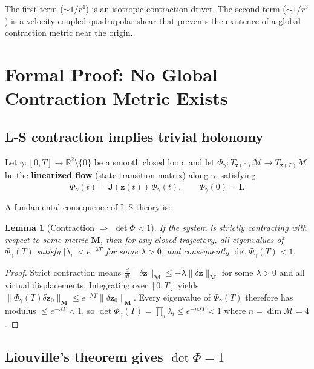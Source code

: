 \documentclass[11pt]{article}
\newtheorem{lemma}[theorem]{Lemma}
\begin{document}
The first term ($\sim 1/r^4$) is an isotropic contraction driver. The second term
($\sim 1/r^3$) is a velocity-coupled quadrupolar shear that prevents the existence
of a global contraction metric near the origin.

\section{Formal Proof: No Global Contraction Metric Exists}
\label{sec:proof}

\subsection{L-S contraction implies trivial holonomy}
\label{sec:ls-holonomy}

Let $\gamma: [0,T] \to \mathbb{R}^2 \setminus \{0\}$ be a smooth closed loop, and
let $\Phi_\gamma: T_{\mathbf{z}(0)}\mathcal{M} \to T_{\mathbf{z}(T)}\mathcal{M}$ be
the \textbf{linearized flow} (state transition matrix) along $\gamma$, satisfying
\[
\dot{\Phi}_\gamma(t) = \mathbf{J}(\mathbf{z}(t)) \,\Phi_\gamma(t), \qquad
\Phi_\gamma(0) = \mathbf{I}.
\]

A fundamental consequence of L-S theory is:

\begin{lemma}[Contraction $\Rightarrow$ $\det\Phi < 1$]
\label{lem:contraction-det}
If the system is strictly contracting with respect to some metric $\mathbf{M}$,
then for any closed trajectory, all eigenvalues of $\Phi_\gamma(T)$ satisfy
$|\lambda_i| < e^{-\lambda T}$ for some $\lambda > 0$, and consequently
$\det\Phi_\gamma(T) < 1$.
\end{lemma}

\begin{proof}
Strict contraction means
$\frac{d}{dt}\|\delta\mathbf{z}\|_{\mathbf{M}} \leq -\lambda\|\delta\mathbf{z}\|_{\mathbf{M}}$
for some $\lambda > 0$ and all virtual displacements. Integrating over $[0,T]$
yields $\|\Phi_\gamma(T)\delta\mathbf{z}_0\|_{\mathbf{M}} \leq e^{-\lambda T}\|\delta\mathbf{z}_0\|_{\mathbf{M}}$.
Every eigenvalue of $\Phi_\gamma(T)$ therefore has modulus $\leq e^{-\lambda T} < 1$,
so $\det\Phi_\gamma(T) = \prod_i \lambda_i \leq e^{-n\lambda T} < 1$ where $n = \dim\mathcal{M} = 4$.
\end{proof}

\subsection{Liouville's theorem gives $\det\Phi = 1$}
\label{sec:liouville}
\end{document}
